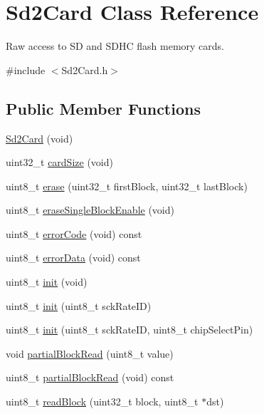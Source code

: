 \hypertarget{class_sd2_card}{}\section{Sd2\+Card Class Reference}
\label{class_sd2_card}


Raw access to S\+D and S\+D\+H\+C flash memory cards.  




{\ttfamily \#include $<$Sd2\+Card.\+h$>$}

\subsection*{Public Member Functions}
\begin{DoxyCompactItemize}
\item 
\hyperlink{class_sd2_card_af85a5ec4f5f4ec89deb8936c3fd7de65}{Sd2\+Card} (void)
\item 
uint32\+\_\+t \hyperlink{class_sd2_card_a862473431cc314238bfccdc531a70d3a}{card\+Size} (void)
\item 
uint8\+\_\+t \hyperlink{class_sd2_card_af49fb720fad1d3ea9f5782da0d87fc0b}{erase} (uint32\+\_\+t first\+Block, uint32\+\_\+t last\+Block)
\item 
uint8\+\_\+t \hyperlink{class_sd2_card_a2e3998f6e910a2936d3ef54bf082b2ce}{erase\+Single\+Block\+Enable} (void)
\item 
uint8\+\_\+t \hyperlink{class_sd2_card_adfa5b1a39875236dff591acbd560bfe7}{error\+Code} (void) const 
\item 
uint8\+\_\+t \hyperlink{class_sd2_card_a13fed56bd5bcfee862acb6de6924936c}{error\+Data} (void) const 
\item 
uint8\+\_\+t \hyperlink{class_sd2_card_afaec9a22060626b02c07a09eff2e9113}{init} (void)
\item 
uint8\+\_\+t \hyperlink{class_sd2_card_ad99b2d2156c9746065c52839ef679354}{init} (uint8\+\_\+t sck\+Rate\+I\+D)
\item 
uint8\+\_\+t \hyperlink{class_sd2_card_a919c789eb9b140426c706f0862780978}{init} (uint8\+\_\+t sck\+Rate\+I\+D, uint8\+\_\+t chip\+Select\+Pin)
\item 
void \hyperlink{class_sd2_card_aa279ac05b3f25acbf10cc424a25750da}{partial\+Block\+Read} (uint8\+\_\+t value)
\item 
uint8\+\_\+t \hyperlink{class_sd2_card_a73ad7fee10e05439f6ec832ce0eb196f}{partial\+Block\+Read} (void) const 
\item 
uint8\+\_\+t \hyperlink{class_sd2_card_ae26d840449a42d45af464fb81b92e2ab}{read\+Block} (uint32\+\_\+t block, uint8\+\_\+t $\ast$dst)

\end{DoxyCompactItemize}
